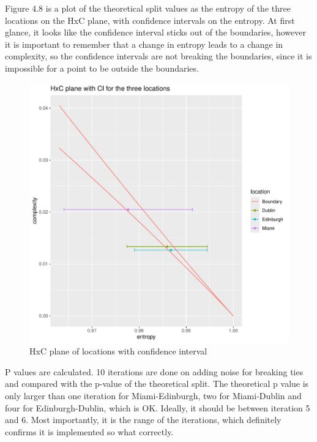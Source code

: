Figure 4.8 is a plot of the theoretical split values as the entropy of the three locations on the HxC plane, with confidence intervals on the entropy. At first glance, it looks like the confidence interval sticks out of the boundaries, however it is important to remember that a change in entropy leads to a change in complexity, so the confidence intervals are not breaking the boundaries, since it is impossible for a point to be outside the boundaries.

\begin{figure}
    \centering
    \includegraphics[width=\textwidth,keepaspectratio]{./Weather/confidenceIntervalPlot.pdf}
    \caption{HxC plane of locations with confidence interval}
\end{figure}

P values are calculated. 10 iterations are done on adding noise for breaking ties and compared with the p-value of the theoretical split. The theoretical p value is only larger than one iteration for Miami-Edinburgh, two for Miami-Dublin and four for Edinburgh-Dublin, which is OK. Ideally, it should be between iteration 5 and 6. Most importantly, it is the range of the iterations, which definitely confirms it is implemented so what correctly. 


